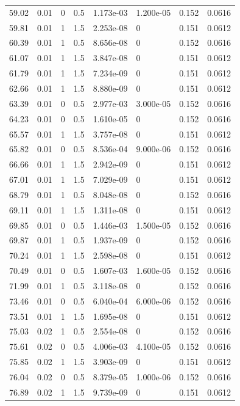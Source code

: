 \documentclass[preview]{standalone}
\begin{document}
{{{\begin{tabular}{L{1.2cm}C{1.2cm} C{0.3cm}C{0.5cm} C{1.4cm}C{1.4cm} C{1.4cm}C{1.4cm}}
  59.02  &  0.01  & 0     & 0.5 &  1.173e-03  & 1.200e-05  & 0.152 &  0.0616   \\ 
  59.81  &  0.01  & 1     & 1.5 &  2.253e-08  & 0  & 0.151 &  0.0612   \\ 
  60.39  &  0.01  & 1     & 0.5 &  8.656e-08  & 0  & 0.152 &  0.0616   \\ 
  61.07  &  0.01  & 1     & 1.5 &  3.847e-08  & 0  & 0.151 &  0.0612   \\ 
  61.79  &  0.01  & 1     & 1.5 &  7.234e-09  & 0  & 0.151 &  0.0612   \\ 
  62.66  &  0.01  & 1     & 1.5 &  8.880e-09  & 0  & 0.151 &  0.0612   \\ 
  63.39  &  0.01  & 0     & 0.5 &  2.977e-03  & 3.000e-05  & 0.152 &  0.0616   \\ 
  64.23  &  0.01  & 0     & 0.5 &  1.610e-05  & 0  & 0.152 &  0.0616   \\ 
  65.57  &  0.01  & 1     & 1.5 &  3.757e-08  & 0  & 0.151 &  0.0612   \\ 
  65.82  &  0.01  & 0     & 0.5 &  8.536e-04  & 9.000e-06  & 0.152 &  0.0616   \\ 
  66.66  &  0.01  & 1     & 1.5 &  2.942e-09  & 0  & 0.151 &  0.0612   \\ 
  67.01  &  0.01  & 1     & 1.5 &  7.029e-09  & 0  & 0.151 &  0.0612   \\ 
  68.79  &  0.01  & 1     & 0.5 &  8.048e-08  & 0  & 0.152 &  0.0616   \\ 
  69.11  &  0.01  & 1     & 1.5 &  1.311e-08  & 0  & 0.151 &  0.0612   \\ 
  69.85  &  0.01  & 0     & 0.5 &  1.446e-03  & 1.500e-05  & 0.152 &  0.0616   \\ 
  69.87  &  0.01  & 1     & 0.5 &  1.937e-09  & 0  & 0.152 &  0.0616   \\ 
  70.24  &  0.01  & 1     & 1.5 &  2.598e-08  & 0  & 0.151 &  0.0612   \\ 
  70.49  &  0.01  & 0     & 0.5 &  1.607e-03  & 1.600e-05  & 0.152 &  0.0616   \\ 
  71.99  &  0.01  & 1     & 0.5 &  3.118e-08  & 0  & 0.152 &  0.0616   \\ 
  73.46  &  0.01  & 0     & 0.5 &  6.040e-04  & 6.000e-06  & 0.152 &  0.0616   \\ 
  73.51  &  0.01  & 1     & 1.5 &  1.695e-08  & 0  & 0.151 &  0.0612   \\ 
  75.03  &  0.02  & 1     & 0.5 &  2.554e-08  & 0  & 0.152 &  0.0616   \\ 
  75.61  &  0.02  & 0     & 0.5 &  4.006e-03  & 4.100e-05  & 0.152 &  0.0616   \\ 
  75.85  &  0.02  & 1     & 1.5 &  3.903e-09  & 0  & 0.151 &  0.0612   \\ 
  76.04  &  0.02  & 0     & 0.5 &  8.379e-05  & 1.000e-06  & 0.152 &  0.0616   \\ 
  76.89  &  0.02  & 1     & 1.5 &  9.739e-09  & 0  & 0.151 &  0.0612   \\ 
\hline 
\end{tabular} 

}}}
\end{document}
